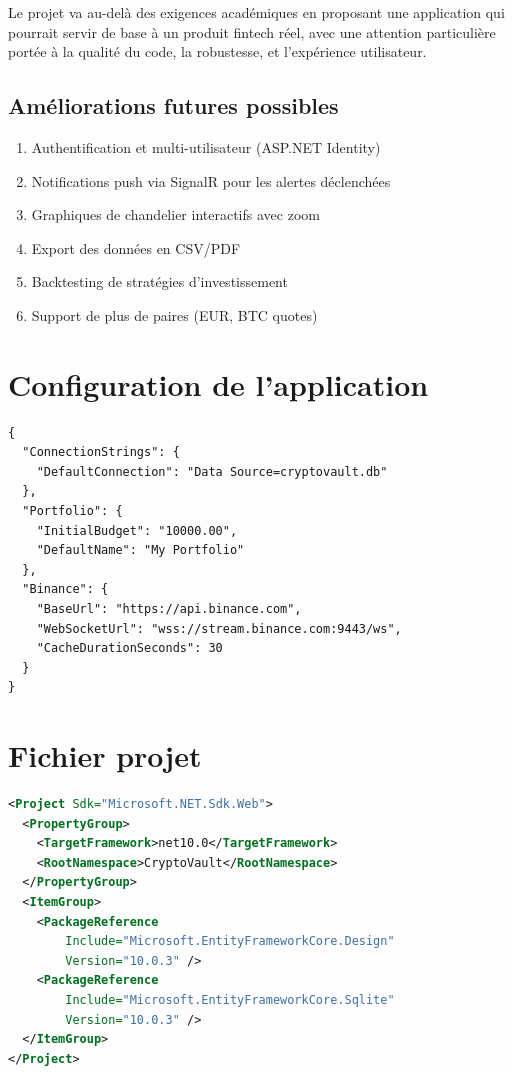 \documentclass[12pt,a4paper]{article}
\begin{document}
Le projet va au-delà des exigences académiques en proposant une application qui pourrait servir de base à un produit fintech réel, avec une attention particulière portée à la qualité du code, la robustesse, et l'expérience utilisateur.

\subsection{Améliorations futures possibles}

\begin{enumerate}
    \item Authentification et multi-utilisateur (ASP.NET Identity)
    \item Notifications push via SignalR pour les alertes déclenchées
    \item Graphiques de chandelier interactifs avec zoom
    \item Export des données en CSV/PDF
    \item Backtesting de stratégies d'investissement
    \item Support de plus de paires (EUR, BTC quotes)
\end{enumerate}

\newpage
\appendix

\section{Configuration de l'application}

\begin{lstlisting}[caption={appsettings.json},language={}]
{
  "ConnectionStrings": {
    "DefaultConnection": "Data Source=cryptovault.db"
  },
  "Portfolio": {
    "InitialBudget": "10000.00",
    "DefaultName": "My Portfolio"
  },
  "Binance": {
    "BaseUrl": "https://api.binance.com",
    "WebSocketUrl": "wss://stream.binance.com:9443/ws",
    "CacheDurationSeconds": 30
  }
}
\end{lstlisting}

\section{Fichier projet}

\begin{lstlisting}[caption={CryptoVault.csproj},language=XML]
<Project Sdk="Microsoft.NET.Sdk.Web">
  <PropertyGroup>
    <TargetFramework>net10.0</TargetFramework>
    <RootNamespace>CryptoVault</RootNamespace>
  </PropertyGroup>
  <ItemGroup>
    <PackageReference
        Include="Microsoft.EntityFrameworkCore.Design"
        Version="10.0.3" />
    <PackageReference
        Include="Microsoft.EntityFrameworkCore.Sqlite"
        Version="10.0.3" />
  </ItemGroup>
</Project>
\end{lstlisting}
\end{document}
